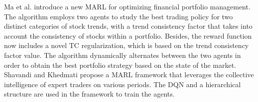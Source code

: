 \documentclass[acmsmall]{acmart}
\begin{document}
Ma et al. \cite{Ma2023} introduce a new MARL for optimizing financial portfolio management. The algorithm employs two agents to study the best trading policy for two distinct categories of stock trends, with a trend consistency factor that takes into account the consistency of stocks within a portfolio. Besides, the reward function now includes a novel TC regularization, which is based on the trend consistency factor value. The algorithm dynamically alternates between the two agents in order to obtain the best portfolio strategy based on the state of the market. %
Shavandi and Khedmati\cite{SHAVANDI2022118124} propose a MARL framework that leverages the collective intelligence of expert traders on various periods. The DQN and a hierarchical structure are used in the framework to train the agents. %
\end{document}
